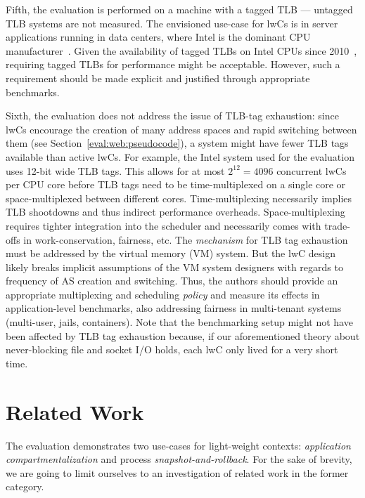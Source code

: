 \documentclass[10pt,twocolumn,a4paper]{article}
\begin{document}
Fifth, the evaluation is performed on a machine with a tagged TLB --- untagged TLB systems are not measured.
The envisioned use-case for lwCs is in server applications running in data centers, where Intel is the dominant CPU manufacturer~\cite{intelmarketshare}.
Given the availability of tagged TLBs on Intel CPUs since 2010~\cite{westmerearrives}, requiring tagged TLBs for performance might be acceptable.
However, such a requirement should be made explicit and justified through appropriate benchmarks.

Sixth, the evaluation does not address the issue of TLB-tag exhaustion:
since lwCs encourage the creation of many address spaces and rapid switching between them (see Section~\ref{eval:web:pseudocode}), a system might have fewer TLB tags available than active lwCs.
For example, the Intel system used for the evaluation uses 12-bit wide TLB tags.\cite{intelsdmpcids}
This allows for at most $2^{12}=4096$ concurrent lwCs per CPU core before TLB tags need to be time-multiplexed on a single core or space-multiplexed between different cores.
Time-multiplexing necessarily implies TLB shootdowns and thus indirect performance overheads.
Space-multiplexing requires tighter integration into the scheduler and necessarily comes with trade-offs in work-conservation, fairness, etc.
The \textit{mechanism} for TLB tag exhaustion must be addressed by the virtual memory (VM) system.
But the lwC design likely breaks implicit assumptions of the VM system designers with regards to frequency of AS creation and switching.
Thus, the authors should provide an appropriate multiplexing and scheduling \textit{policy} and measure its effects in application-level benchmarks, also addressing fairness in multi-tenant systems (multi-user, jails, containers).
Note that the benchmarking setup might not have been affected by TLB tag exhaustion because, if our aforementioned theory about never-blocking file and socket I/O holds, each lwC only lived for a very short time.


\section{Related Work}\label{rel}
The evaluation demonstrates two use-cases for light-weight contexts: \textit{application compartmentalization} and process \textit{snapshot-and-rollback}.
For the sake of brevity, we are going to limit ourselves to an investigation of related work in the former category.
\end{document}
